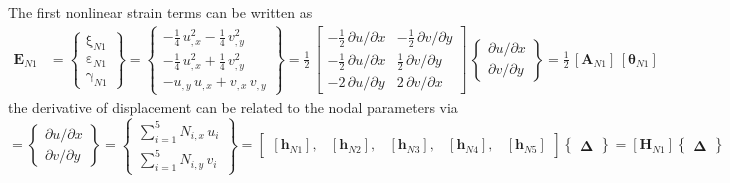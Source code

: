 The first nonlinear strain terms can be written as 
\begin{equation}
\begin{aligned}
\mathbf{E}_{N1} & =  \begin{Bmatrix}
\mathrm \xi_{N1} \\
\mathrm \varepsilon_{N1} \\
\mathrm \gamma_{N1} \end{Bmatrix} =
 \begin{Bmatrix}
-\tfrac{1}{4} \, u_{,x}^2 -   \tfrac{1}{4} \, v_{,y}^2 \\
-\tfrac{1}{4} \, u_{,x}^2 + \tfrac{1}{4} \, v_{,y}^2 \\
-u_{,y} \, u_{,x} + v_{,x} \, v_{,y} \end{Bmatrix} = \frac{1}{2} \, \begin{bmatrix}
-\tfrac{1}{2} \, \partial u / \partial x &  - \tfrac{1}{2} \, \partial v / \partial y \\
-\tfrac{1}{2} \, \partial u / \partial x &  \tfrac{1}{2} \, \partial v / \partial y \\
-2 \, \partial u / \partial y  & 2 \, \partial v / \partial x  \end{bmatrix} \, \begin{Bmatrix}
\partial u / \partial x\\
\partial v / \partial y
\end{Bmatrix}
= \tfrac{1}{2} \, [\mathbf{A}_{N1}] \, [\boldsymbol{\theta}_{N1}]
\end{aligned}
\end{equation}
the derivative of displacement can be related to the nodal parameters via
\begin{equation}
[\boldsymbol{\theta}_{N1}] =  \begin{Bmatrix}
\partial u / \partial x\\
\partial v / \partial y
\end{Bmatrix}
= \begin{Bmatrix}
\sum\nolimits_{i=1}^5 N_{i,x} \, u_i\\
\sum\nolimits_{i=1}^5 N_{i,y} \, v_i
\end{Bmatrix} 
= \begin{bmatrix}
[\mathbf{h}_{N1}], & [\mathbf{h}_{N2}], & [\mathbf{h}_{N3}], & [\mathbf{h}_{N4}], & [\mathbf{h}_{N5}] 
\end{bmatrix}  \begin{Bmatrix} \boldsymbol{\Delta} \end{Bmatrix}  
= [\mathbf{H}_{N1}] \begin{Bmatrix} \boldsymbol{\Delta} \end{Bmatrix} 
\end{equation}

